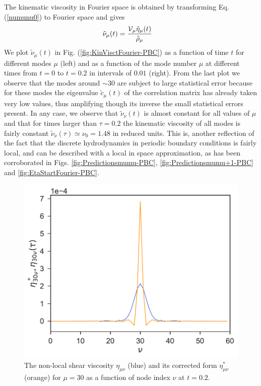 \documentclass[a4paper,openright,12pt]{book}
\begin{document}
The kinematic viscosity  in Fourier space is  obtained by transforming Eq. (\ref{numunu0})
to Fourier space  and gives
\begin{align}
\tilde{\nu}_\mu(t)&=  \frac{{\cal V}_\mu \tilde{\eta}_\mu(t)}{\tilde{\rho}_\mu}
  \label{kinViscFourier}
\end{align}
We plot $\tilde{\nu}_\mu(t)$  in Fig.  (\ref{fig:KinVisctFourier-PBC}) as a  function of time
$t$ for  different modes  $\mu$ (left)  and as a  function of  the mode
number $\mu$  at different times from $t=0$ to $t=0.2$ in intervals of $0.01$ (right). From
the last plot  we observe that the modes around  $\sim 30$ are subject
to  large statistical  error because  for these  modes the  eigenvalue
$\tilde{c}_\mu(t)$ of  the correlation  matrix has already  taken very
low values, thus  amplifying though its inverse  the small statistical
errors present. In  any case, we observe  that $\tilde{\nu}_\nu(t)$ is
almost constant for all values of $\mu$ and that for times larger than
$\tau=0.2$ the  kinematic viscosity  of all  modes is  fairly constant
$\tilde{\nu}_\nu(\tau)\simeq\nu_0=1.48$  in  reduced units.  This  is,
another reflection  of the  fact that the  discrete hydrodynamics in 
periodic boundary conditions is fairly local, and can be described with
 a local in space approximation, as has been corroborated in Figs. 
 \ref{fig:Predictionsmumu-PBC}, \ref{fig:Predictionsmumu+1-PBC} and \ref{fig:EtaStartFourier-PBC}.


\begin{figure}[h!]
  \centering
\includegraphics[scale=0.45]{CompareEtas-PBC}
\caption[Comparison $\eta^*_{30,\nu}$ and $eta_{30,\nu}$]{The non-local shear viscosity $\eta_{\mu\nu}$ (blue) and its corrected form $\eta^*_{\mu\nu}$ (orange) for $\mu=30$ as a function of node index $\nu$ at $t=0.2$.}
\label{fig:CompareEtas-PBC}
\end{figure}
\end{document}

